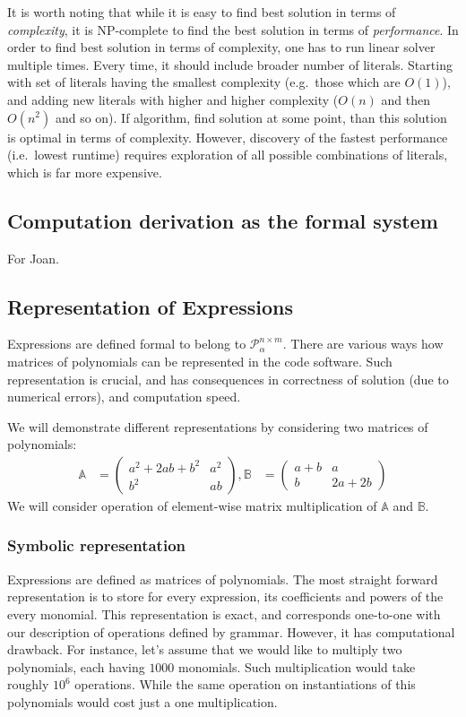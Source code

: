 It is worth noting that while it is easy to find best solution in
terms of {\em complexity}, it is NP-complete to find the best solution
in terms of {\em performance}. In order to find best solution in terms
of complexity, one has to run linear solver multiple times. Every
time, it should include broader number of literals. Starting with set
of literals having the smallest complexity (e.g.~those which are
$O(1)$), and adding new literals with higher and higher complexity
($O(n)$ and then $O(n^2)$ and so on). If algorithm, find solution at
some point, than this solution is optimal in terms of
complexity. However, discovery of the fastest performance (i.e.~lowest
runtime) requires exploration of all possible combinations of literals,
which is far more expensive.  

\subsection{Computation derivation as the formal system}

For Joan.

\subsection{Representation of Expressions}
Expressions are defined formal to belong to $\mathcal{P}^{n \times m}_\alpha$. There are various
ways how matrices of polynomials can be represented in the code software. Such representation is crucial, and has consequences in
 correctness of solution (due to numerical errors), and computation speed.

We will demonstrate different representations by considering two matrices of polynomials:
\begin{align*}
\mathbb{A} &= \begin{pmatrix} a^2 + 2ab + b^2 & a^2\\ b^2 & ab \end{pmatrix}, \mathbb{B} &= \begin{pmatrix} a + b & a\\ b & 2a + 2b \end{pmatrix}
\end{align*}
We will consider operation of element-wise matrix multiplication of $\mathbb{A}$ and $\mathbb{B}$.

\subsubsection{Symbolic representation}
Expressions are defined as matrices of polynomials. The most straight forward 
representation is to store for every expression, its coefficients and powers of the every monomial.
This representation is exact, and corresponds one-to-one with our description of operations
defined by grammar. However, it has computational drawback. 
For instance, let's assume that we would like to multiply two polynomials, each having $1000$ monomials.
Such multiplication would take roughly $10^6$ operations. While the same operation on instantiations of
this polynomials would cost just a one multiplication.


